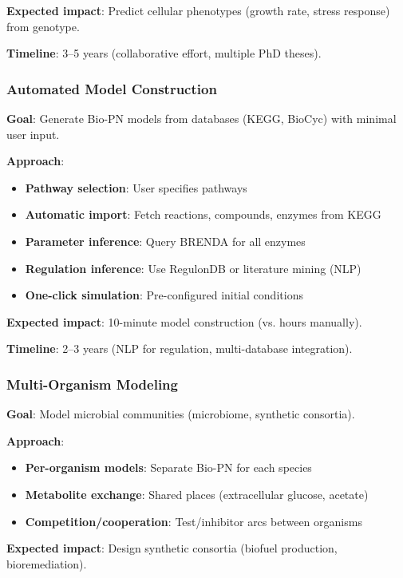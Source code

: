 \textbf{Expected impact}: Predict cellular phenotypes (growth rate, stress response) from genotype.

\textbf{Timeline}: 3--5 years (collaborative effort, multiple PhD theses).

\subsubsection{Automated Model Construction}

\textbf{Goal}: Generate Bio-PN models from databases (KEGG, BioCyc) with minimal user input.

\textbf{Approach}:
\begin{itemize}
    \item \textbf{Pathway selection}: User specifies pathways
    \item \textbf{Automatic import}: Fetch reactions, compounds, enzymes from KEGG
    \item \textbf{Parameter inference}: Query BRENDA for all enzymes
    \item \textbf{Regulation inference}: Use RegulonDB or literature mining (NLP)
    \item \textbf{One-click simulation}: Pre-configured initial conditions
\end{itemize}

\textbf{Expected impact}: 10-minute model construction (vs. hours manually).

\textbf{Timeline}: 2--3 years (NLP for regulation, multi-database integration).

\subsubsection{Multi-Organism Modeling}

\textbf{Goal}: Model microbial communities (microbiome, synthetic consortia).

\textbf{Approach}:
\begin{itemize}
    \item \textbf{Per-organism models}: Separate Bio-PN for each species
    \item \textbf{Metabolite exchange}: Shared places (extracellular glucose, acetate)
    \item \textbf{Competition/cooperation}: Test/inhibitor arcs between organisms
\end{itemize}

\textbf{Expected impact}: Design synthetic consortia (biofuel production, bioremediation).

